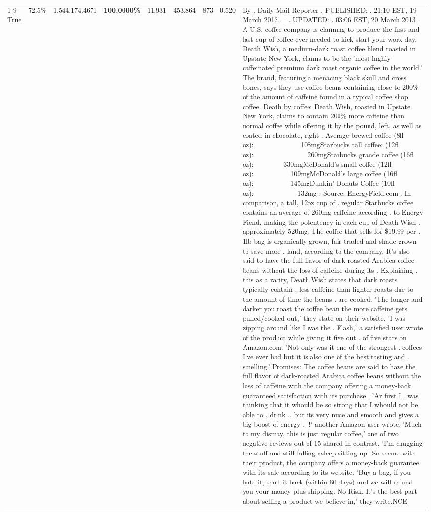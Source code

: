 \begin{table}[H]
{\begin{tabular}{lllrlllll}
\cline{1-9}
True & 72.5\% & 1,544,174.4671 & \bfseries \color{red} 100.0000\% & 11.931 & 453.864 & 873 & 0.520 & By . Daily Mail Reporter . PUBLISHED: . 21:10 EST, 19 March 2013 . | . UPDATED: . 03:06 EST, 20 March 2013 . A U.S. coffee company is claiming to produce the first and last cup of coffee ever needed to kick start your work day. Death Wish, a medium-dark roast coffee blend roasted in Upstate New York, claims to be the 'most highly caffeinated premium dark roast organic coffee in the world.' The brand, featuring a menacing black skull and cross bones, says they use coffee beans containing close to 200\% of the amount of caffeine found in a typical coffee shop coffee. Death by coffee: Death Wish, roasted in Upstate New York, claims to contain 200\% more caffeine than normal coffee while offering it by the pound, left, as well as coated in chocolate, right . Average brewed coffee (8fl oz):              108mgStarbucks tall coffee: (12fl oz):                260mgStarbucks grande coffee (16fl oz):         330mgMcDonald's small coffee (12fl oz):           109mgMcDonald's large coffee (16fl oz):           145mgDunkin' Donuts Coffee (10fl oz):             132mg . Source: EnergyField.com . In comparison, a tall, 12oz cup of . regular Starbucks coffee contains an average of 260mg caffeine according . to Energy Fiend, making the potentency in each cup of Death Wish . approximately 520mg. The coffee that sells for \$19.99 per . 1lb bag is organically grown, fair traded and shade grown to save more . land, according to the company. It's also said to have the full flavor of dark-roasted Arabica coffee beans without the loss of caffeine during its . Explaining . this as a rarity, Death Wish states that dark roasts typically contain . less caffeine than lighter roasts due to the amount of time the beans . are cooked. 'The longer and darker you roast the coffee bean the more caffeine gets pulled/cooked out,' they state on their website. 'I was zipping around like I was the . Flash,' a satisfied user wrote of the product while giving it five out . of five stars on Amazon.com. 'Not only was it one of the strongest . coffees I've ever had but it is also one of the best tasting and . smelling.’ Promises: The coffee beans are said to have the full flavor of dark-roasted Arabica coffee beans without the loss of caffeine with the company offering a money-back guaranteed satisfaction with its purchase . 'Ar first I . was thinking that it whould be so strong that I whould not be able to . drink .. but its very nuce and smooth and gives a big boost of energy . !!' another Amazon user wrote. 'Much to my dismay, this is just regular coffee,' one of two negative reviews out of 15 shared in contrast. 'I'm chugging the stuff and still falling asleep sitting up.' So secure with their product, the company offers a money-back guarantee with its sale according to its website. 'Buy a bag, if you hate it, send it back (within 60 days) and we will refund you your money plus shipping. No Risk. It’s the best part about selling a product we believe in,' they write.NCE \\

\end{tabular}}
\end{table}
